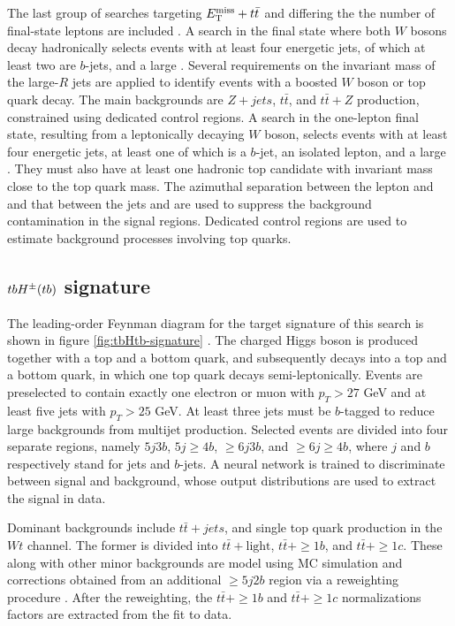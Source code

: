 The last group of searches targeting $E_{\mathrm{T}}^{\mathrm{miss}}+t\bar{t}$ and differing the the number of final-state leptons are included \cite{SUSY-2016-18}. A search in the final state where both $W$ bosons decay hadronically selects events with at least four energetic jets, of which at least two are $b$-jets, and a large \met. Several requirements on the invariant mass of the large-$R$ jets are applied to identify events with a boosted $W$ boson or top quark decay. The main backgrounds are $Z+jets$, $t\bar{t}$, and $t\bar{t}+Z$ production, constrained using dedicated control regions. A search in the one-lepton final state, resulting from a leptonically decaying $W$ boson, selects events with at least four energetic jets, at least one of which is a $b$-jet, an isolated lepton, and a large \met \cite{SUSY-2016-16}. They must also have at least one hadronic top candidate with invariant mass close to the top quark mass. The azimuthal separation between the lepton and \met and that between the jets and \met are used to suppress the background contamination in the signal regions. Dedicated control regions are used to estimate background processes involving top quarks.

\subsection{\texorpdfstring{$tbH^{\pm}(tb)$}{TEXT} signature}
\label{subsect:tbHtb}
The leading-order Feynman diagram for the target signature of this search is shown in figure \ref{fig:tbHtb-signature} \cite{HDBS-2018-51}. The charged Higgs boson is produced together with a top and a bottom quark, and subsequently decays into a top and a bottom quark, in which one top quark decays semi-leptonically. Events are preselected to contain exactly one electron or muon with $p_T>27$ GeV and at least five jets with $p_T>25$ GeV. At least three jets must be $b$-tagged to reduce large backgrounds from multijet production. Selected events are divided into four separate regions, namely $5j3b$, $5j\ge 4b$, $\ge 6j3b$, and $\ge 6j\ge 4b$, where $j$ and $b$ respectively stand for jets and $b$-jets. A neural network is trained to discriminate between signal and background, whose output distributions are used to extract the signal in data. 

Dominant backgrounds include $t\bar{t}+jets$, and single top quark production in the $Wt$ channel. The former is divided into $t\bar{t}+\mathrm{light}$, $t\bar{t}+\ge 1b$, and $t\bar{t}+\ge 1c$. These along with other minor backgrounds are model using MC simulation and corrections obtained from an additional $\ge 5j2b$ region via a reweighting procedure \cite{ATL-PHYS-PUB-2018-009, TOPQ-2018-18}. After the reweighting, the $t\bar{t}+\ge 1b$ and $t\bar{t}+ \ge 1c$ normalizations factors are extracted from the fit to data. 

